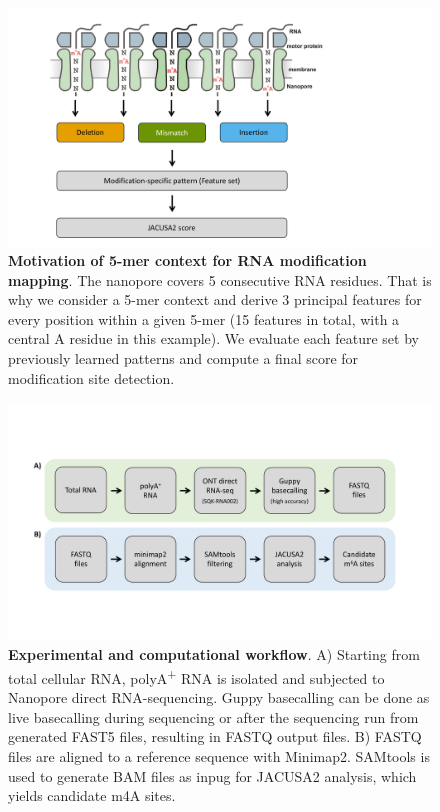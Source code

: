 \documentclass[times, 11pt, a4paper]{article}
\begin{document}
\begin{figure}[h!]
    \includegraphics[width = 1\textwidth]{Figure2.pdf}
  \caption{\textbf{Motivation of 5-mer context for RNA modification mapping}. The nanopore covers 5 consecutive RNA residues. That is why we consider a 5-mer context and derive 3 principal features for every position within a given 5-mer (15 features in total, with a central A residue in this example). We evaluate each feature set by previously learned patterns and compute a final score for modification site detection.}
  \label{fig:5mer}
      \end{figure}
\newpage

\begin{figure}[h!]
    \includegraphics[width = 1\textwidth]{Figure3.pdf}
  \caption{\textbf{Experimental and computational workflow}. A) Starting from total cellular RNA, polyA\textsuperscript{+} RNA is isolated and subjected to Nanopore direct RNA-sequencing. Guppy basecalling can be done as live basecalling during sequencing or after the sequencing run from generated FAST5 files, resulting in FASTQ output files. B) FASTQ files are aligned to a reference sequence with Minimap2. SAMtools is used to generate BAM files as inpug for JACUSA2 analysis, which yields candidate m4A sites.}
  \label{fig:workflow}
      \end{figure}
\newpage
\end{document}
